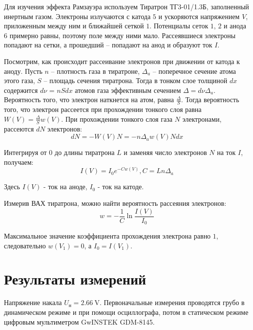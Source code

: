 \documentclass[12pt]{article}%
\begin{document}
%

        Для изучения эффекта Рамзауэра используем Тиратрон ТГ3-01/1.3Б,
        заполненный инертным газом.
        Электроны излучаются с катода $5$ и ускоряются напряжением $V$,
        приложенным между ним и ближайшей сеткой $1$. Потенциалы сеток $1$, $2$
        и анода $6$ примерно равны, поэтому поле между ними мало. Рассеявшиеся
        электроны попадают на сетки, а прошедший -- попадают на анод и образуют ток $I$.

        Посмотрим, как происходит рассеивание электронов при движении от катода к аноду.
        Пусть $n$ -- плотность газа в тиратроне, $\Delta_a$ -- поперечное сечение атома этого газа,
        $S$ -- площадь сечения тиратрона.
        Тогда в тонком слое толщиной $dx$ содержится $d\nu$ = $n S dx$ атомов газа эффективным сечением
        $\Delta = d \nu \Delta_a$. Вероятность того, что электрон наткнется на атом, равна $\frac{\Delta}{S}$.
        Тогда вероятность того, что электрон рассеется при прохождении тонкого слоя равна $W(V) = \frac{\Delta}{S} w(V)$.
        При прохождении тонкого слоя газа $N$ электронами, рассеются $dN$ электронов:
\[%
dN = - W(V) N = - n \Delta_a w(V) N dx%
\]%

        Интегрируя от $0$ до длины тиратрона $L$ и заменяя число электронов $N$ на ток $I$, получаем:
\[%
I(V) = I_0 e^{-C w \left( V \right)}, C = L n \Delta_a%
\]%

        Здесь $I(V)$ - ток на аноде, $I_0$ - ток на катоде.

        Измерив ВАХ тиратрона, можно найти вероятность рассеяния электронов:
\[%
w = - \frac{1}{C}\ln{\frac{I(V)}{I_0}}%
\]%

        Максимальное значение коэффициента прохождения электрона равно $1$, следовательно $w(V_1) = 0$, а $I_0 = I(V_1)$.
    

%
\section{Результаты измерений}%
\label{sec:}%

        Напряжение накала $U_{\text{н}} = \qty[]{2.66}{\volt}$.
        Первоначальные измерения проводятся грубо в динамическом режиме и
        при помощи осциллографа, потом в статическом режиме цифровым мультиметром GwINSTEK GDM-8145.
\end{document}
